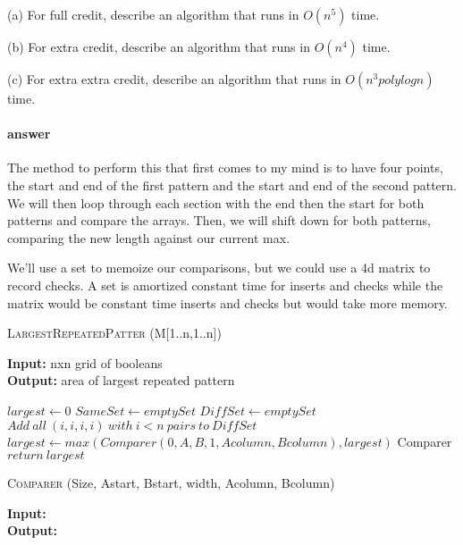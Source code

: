 \documentclass{article}
\begin{document}
(a) For full credit, describe an algorithm that runs in $O(n^{5})$ time.

(b) For extra credit, describe an algorithm that runs in $O(n^{4})$ time.

(c) For extra extra credit, describe an algorithm that runs in $O(n^{3} polylog n)$
time.

\paragraph{answer}

The method to perform this that first comes to my mind is to have four points,
the start and end of the first pattern and the start and end of the second pattern.
We will then loop through each section with the end then the start for both patterns
and compare the arrays. Then, we will shift down for both patterns, comparing the new
length against our current max.

We'll use a set to memoize our comparisons, but we could use a 4d matrix to record checks.
A set is amortized constant time for inserts and checks while the matrix would be constant time
inserts and checks but would take more memory.

\begin{algorithm} \caption{\textsc{LargestRepeatedPatter} (M[1..n,1..n])}\label{alg:seb}
    {\bf Input:} nxn grid of booleans\\
    {\bf Output:} area of largest repeated pattern
    \begin{algorithmic}[1]
        \State$largest \gets 0$
        \State$SameSet \gets emptySet$
        \State$DiffSet \gets emptySet$
        \State$Add\ all\ (i,i,i,i)\ with\ i < n\ pairs\ to\ DiffSet$
                        \State$largest \gets max(Comparer(0, A, B, 1, Acolumn, Bcolumn), largest)$
                            Comparer
                        \EndIf{}
                    \EndFor{}
                \EndFor{}
            \EndFor{}
        \EndFor{}
        \State$return\ largest$
    \end{algorithmic}
\end{algorithm}

\begin{algorithm} \caption{\textsc{Comparer} (Size, Astart, Bstart, width, Acolumn, Bcolumn)}\label{alg:seb}
    {\bf Input:} \\
    {\bf Output:}
    \begin{algorithmic}[1]
        \State$$
    \end{algorithmic}
\end{algorithm}
\end{document}
